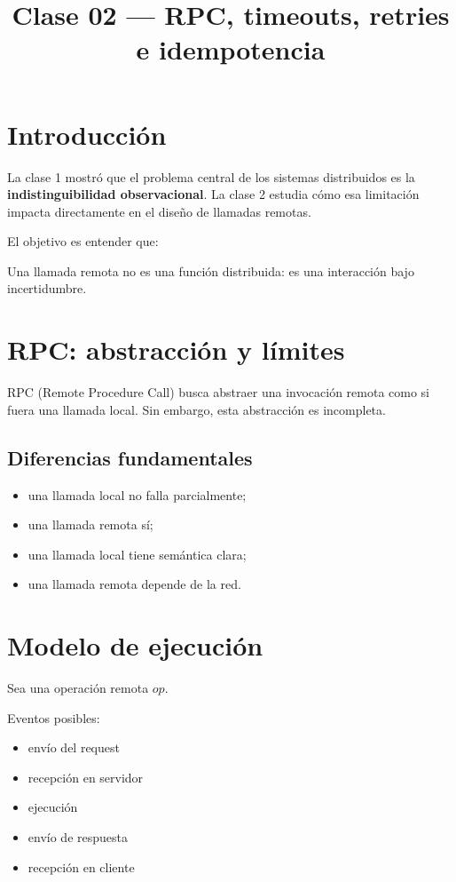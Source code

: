 \documentclass[variant=apuntes,cover=institutional,mode=screen]{ua-engineering-v6-article}
\title{Clase 02 --- RPC, timeouts, retries e idempotencia}
\author{\UAProfessor}
\date{\UADate}
\begin{document}
\maketitle

\section{Introducción}

La clase 1 mostró que el problema central de los sistemas distribuidos es la \textbf{indistinguibilidad observacional}. La clase 2 estudia cómo esa limitación impacta directamente en el diseño de llamadas remotas.

El objetivo es entender que:

\begin{uakeybox}
Una llamada remota no es una función distribuida: es una interacción bajo incertidumbre.
\end{uakeybox}

\section{RPC: abstracción y límites}

RPC (Remote Procedure Call) busca abstraer una invocación remota como si fuera una llamada local. Sin embargo, esta abstracción es incompleta.

\subsection{Diferencias fundamentales}

\begin{itemize}
\item una llamada local no falla parcialmente;
\item una llamada remota sí;
\item una llamada local tiene semántica clara;
\item una llamada remota depende de la red.
\end{itemize}

\section{Modelo de ejecución}

Sea una operación remota $op$.

Eventos posibles:

\begin{itemize}
\item envío del request
\item recepción en servidor
\item ejecución
\item envío de respuesta
\item recepción en cliente
\end{itemize}
\end{document}
